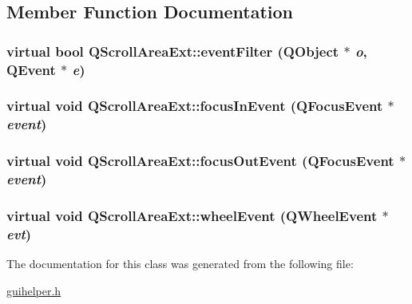\subsection{Member Function Documentation}
\hypertarget{class_q_scroll_area_ext_b2c7b82d637aa251b0f5cbe66a130b64}{
\subsubsection[{eventFilter}]{\setlength{\rightskip}{0pt plus 5cm}virtual bool QScrollAreaExt::eventFilter (QObject $\ast$ {\em o}, \/  QEvent $\ast$ {\em e})}}
\label{class_q_scroll_area_ext_b2c7b82d637aa251b0f5cbe66a130b64}


\hypertarget{class_q_scroll_area_ext_3d883e53522c04e303add034f6db2882}{
\subsubsection[{focusInEvent}]{\setlength{\rightskip}{0pt plus 5cm}virtual void QScrollAreaExt::focusInEvent (QFocusEvent $\ast$ {\em event})}}
\label{class_q_scroll_area_ext_3d883e53522c04e303add034f6db2882}


\hypertarget{class_q_scroll_area_ext_69308702f79443e0c7e6c3142cca270c}{
\subsubsection[{focusOutEvent}]{\setlength{\rightskip}{0pt plus 5cm}virtual void QScrollAreaExt::focusOutEvent (QFocusEvent $\ast$ {\em event})}}
\label{class_q_scroll_area_ext_69308702f79443e0c7e6c3142cca270c}


\hypertarget{class_q_scroll_area_ext_77d5c65e3b4a2c0a9fae038507cdb720}{
\subsubsection[{wheelEvent}]{\setlength{\rightskip}{0pt plus 5cm}virtual void QScrollAreaExt::wheelEvent (QWheelEvent $\ast$ {\em evt})}}
\label{class_q_scroll_area_ext_77d5c65e3b4a2c0a9fae038507cdb720}




The documentation for this class was generated from the following file:\begin{CompactItemize}
\item 
\hyperlink{guihelper_8h}{guihelper.h}\end{CompactItemize}
